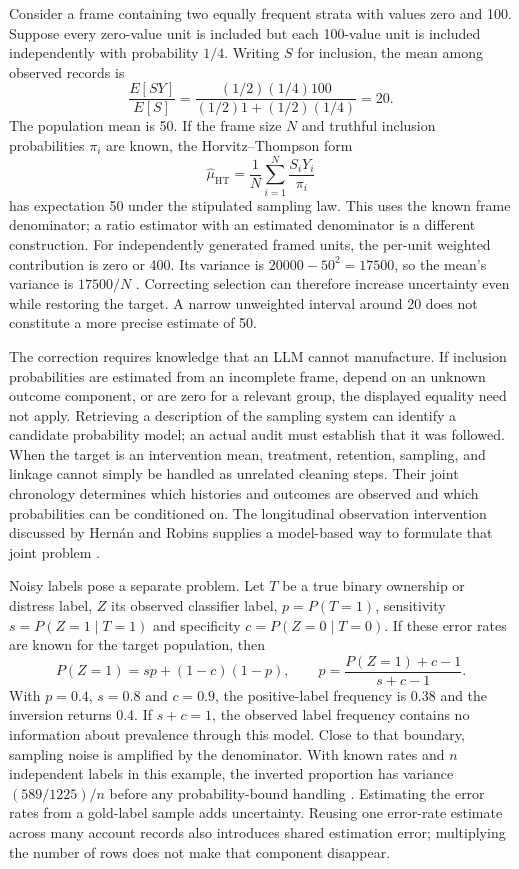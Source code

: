 Consider a frame containing two equally frequent strata with values zero and
100. Suppose every zero-value unit is included but each 100-value unit is
included independently with probability $1/4$. Writing $S$ for inclusion,
the mean among observed records is
\[
 \frac{E[SY]}{E[S]}=
 \frac{(1/2)(1/4)100}{(1/2)1+(1/2)(1/4)}=20.
\]
The population mean is 50. If the frame size $N$ and truthful inclusion
probabilities $\pi_i$ are known, the Horvitz--Thompson form
\[
 \widehat\mu_{\mathrm{HT}}=
 \frac1N\sum_{i=1}^N\frac{S_iY_i}{\pi_i}
\]
has expectation 50 under the stipulated sampling law. This uses the known
frame denominator; a ratio estimator with an estimated denominator is a
different construction. For independently generated framed units, the
per-unit weighted contribution is zero or 400. Its variance is
$20000-50^2=17500$, so the mean's variance is $17500/N$
\cite{exec14_workflow_oracle}. Correcting selection can therefore increase
uncertainty even while restoring the target. A narrow unweighted interval
around 20 does not constitute a more precise estimate of 50.

The correction requires knowledge that an LLM cannot manufacture. If inclusion
probabilities are estimated from an incomplete frame, depend on an unknown
outcome component, or are zero for a relevant group, the displayed equality
need not apply. Retrieving a description of the sampling system can identify
a candidate probability model; an actual audit must establish that it was
followed. When the target is an intervention mean, treatment, retention,
sampling, and linkage cannot simply be handled as unrelated cleaning steps.
Their joint chronology determines which histories and outcomes are observed
and which probabilities can be conditioned on. The longitudinal observation
intervention discussed by Hern\'an and Robins supplies a model-based way to
formulate that joint problem \cite{hernan2020}.

Noisy labels pose a separate problem. Let $T$ be a true binary ownership or
distress label, $Z$ its observed classifier label, $p=P(T=1)$, sensitivity
$s=P(Z=1\mid T=1)$ and specificity $c=P(Z=0\mid T=0)$. If these error rates are
known for the target population, then
\[
 P(Z=1)=sp+(1-c)(1-p),\qquad
 p=\frac{P(Z=1)+c-1}{s+c-1}.
\]
With $p=0.4$, $s=0.8$ and $c=0.9$, the positive-label frequency is 0.38 and
the inversion returns 0.4. If $s+c=1$, the observed label frequency contains
no information about prevalence through this model. Close to that boundary,
sampling noise is amplified by the denominator. With known rates and $n$
independent labels in this example, the inverted proportion has variance
$(589/1225)/n$ before any probability-bound handling
\cite{exec14_workflow_oracle}. Estimating the error rates from a gold-label
sample adds uncertainty. Reusing one error-rate estimate across many account
records also introduces shared estimation error; multiplying the number of
rows does not make that component disappear.


